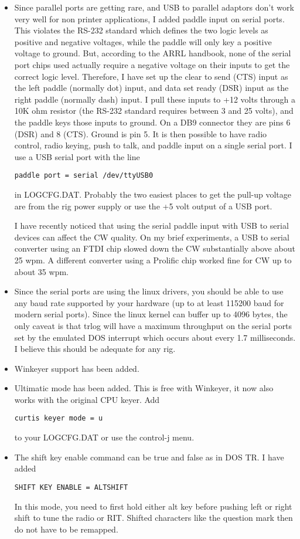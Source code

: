 \documentclass[12pt]{article}
\begin{document}
\begin{itemize}
\item
Since parallel ports are getting rare, and USB to parallel adaptors
don't work very well for non printer applications, I added paddle
input on serial ports. This violates the RS-232 standard which defines
the two logic levels as positive and negative voltages, while the
paddle will only key a positive voltage to ground. But, according
to the ARRL
handbook, none of the serial port chips used actually require
a negative voltage on their inputs to get the correct logic level.
Therefore, I have set up the clear to send (CTS) input as the left
paddle (normally dot) input, and data set ready (DSR) input as the
right paddle (normally dash) input. I pull these inputs to +12 volts through
a 10K ohm resistor (the RS-232 standard requires between 3 and 25 volts),
and the paddle keys those inputs to ground. On a DB9 connector they
are pins 6 (DSR) and 8 (CTS). Ground is pin 5. It is then possible
to have radio control, radio keying, push to talk, and paddle input
on a single serial port. I use a USB serial port with the line
\begin{verbatim}
paddle port = serial /dev/ttyUSB0
\end{verbatim}
in LOGCFG.DAT. Probably the two easiest places to get the pull-up voltage
are from the rig power supply or use the +5 volt output of a USB port.

I have recently noticed that using the serial paddle input with
USB to serial devices can affect the CW quality. On my brief experiments,
a USB to serial converter using an FTDI chip slowed down the CW substantially
above about 25 wpm. A different converter using a Prolific chip worked
fine for CW up to about 35 wpm.

\item
Since the serial ports are using the linux drivers, you should
be able to use
any baud rate supported by your hardware (up to at least 115200 baud
for modern serial ports). Since the linux kernel can buffer up
to 4096 bytes, the only caveat is that trlog will have a maximum throughput
on the serial ports set by the emulated DOS interrupt which
occurs about every 1.7 milliseconds. I believe this should be adequate for
any rig.

\item
Winkeyer support has been added.

\item
Ultimatic mode has been added. This is free with Winkeyer, it now also
works with the original CPU keyer.
Add
\begin{verbatim}
curtis keyer mode = u
\end{verbatim}
to your LOGCFG.DAT or use the control-j menu.

\item
The shift key enable command can be true and false as in DOS TR. I have
added
\begin{verbatim}
SHIFT KEY ENABLE = ALTSHIFT
\end{verbatim}
In this mode, you need to first hold either alt key before pushing
left or right shift to tune the radio or RIT. Shifted characters like
the question mark then do not have to be remapped.

\end{itemize}
\end{document}
